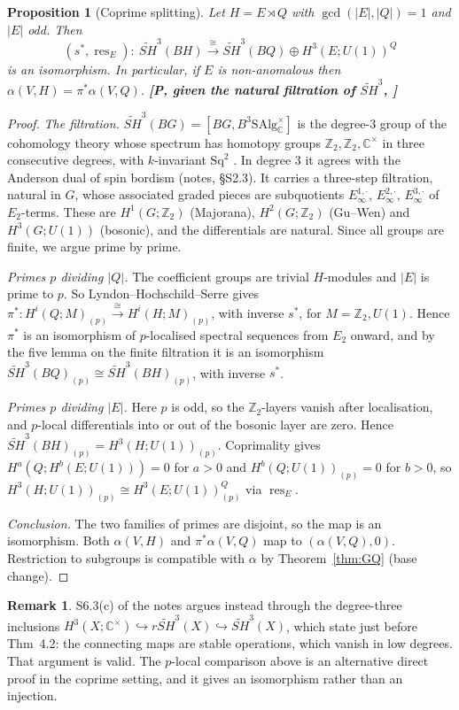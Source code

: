 \documentclass[11pt]{article}
\newtheorem{proposition}[theorem]{Proposition}
\theoremstyle{definition}
\newtheorem{remark}[theorem]{Remark}
\newcommand{\SH}{\widetilde{SH}}
\newcommand{\Z}{\mathbb Z}
\newcommand{\C}{\mathbb C}
\newcommand{\st}[1]{\textbf{[#1]}}
\begin{document}
\begin{proposition}[Coprime splitting]\label{prop:coprime}
Let $H=E\rtimes Q$ with $\gcd(|E|,|Q|)=1$ and $|E|$ odd. Then
\[
(s^*,\operatorname{res}_E):\ \SH^3(BH)\xrightarrow{\ \cong\ }\SH^3(BQ)\oplus H^3(E;U(1))^Q
\]
is an isomorphism. In particular, if $E$ is non-anomalous then $\alpha(V,H)=\pi^*\alpha(V,Q)$. \st{P, given the natural
filtration of $\SH^3$, \cite[Def.~4.1]{GJF}}
\end{proposition}
\begin{proof}
\emph{The filtration.} $\SH^3(BG)=[BG,B^3\mathrm{SAlg}^\times_\C]$ is the degree-3 group of the
cohomology theory whose spectrum has homotopy groups $\Z_2,\Z_2,\C^\times$ in three consecutive
degrees, with $k$-invariant $\mathrm{Sq}^2$ \cite[Def.~4.1]{GJF}. In degree 3 it agrees with the
Anderson dual of spin bordism (notes, \S S2.3). It carries a three-step filtration, natural in $G$, whose
associated graded pieces are subquotients $E_\infty^{1,\cdot}$, $E_\infty^{2,\cdot}$,
$E_\infty^{3,\cdot}$ of $E_2$-terms. These are $H^1(G;\Z_2)$ (Majorana), $H^2(G;\Z_2)$ (Gu--Wen)
and $H^3(G;U(1))$ (bosonic), and the differentials are natural. Since all groups are finite, we
argue prime by prime.

\emph{Primes $p$ dividing $|Q|$.} The coefficient groups are trivial $H$-modules and $|E|$ is
prime to $p$. So Lyndon--Hochschild--Serre gives
$\pi^*:H^i(Q;M)_{(p)}\xrightarrow{\cong}H^i(H;M)_{(p)}$, with inverse $s^*$, for $M=\Z_2,U(1)$.
Hence $\pi^*$ is an isomorphism of $p$-localised spectral sequences from $E_2$ onward, and by
the five lemma on the finite filtration it is an isomorphism
$\SH^3(BQ)_{(p)}\cong\SH^3(BH)_{(p)}$, with inverse $s^*$.

\emph{Primes $p$ dividing $|E|$.} Here $p$ is odd, so the $\Z_2$-layers vanish after
localisation, and $p$-local differentials into or out of the bosonic layer are zero. Hence
$\SH^3(BH)_{(p)}=H^3(H;U(1))_{(p)}$. Coprimality gives $H^a(Q;H^b(E;U(1)))=0$ for $a>0$ and
$H^b(Q;U(1))_{(p)}=0$ for $b>0$, so $H^3(H;U(1))_{(p)}\cong H^3(E;U(1))^Q_{(p)}$ via
$\operatorname{res}_E$.

\emph{Conclusion.} The two families of primes are disjoint, so the map is an isomorphism. Both
$\alpha(V,H)$ and $\pi^*\alpha(V,Q)$ map to $(\alpha(V,Q),0)$. Restriction to subgroups is
compatible with $\alpha$ by Theorem~\ref{thm:GQ} (base change).
\end{proof}

\begin{remark}
S6.3(c) of the notes argues instead through the degree-three inclusions
$H^3(X;\C^\times)\hookrightarrow r\SH^3(X)\hookrightarrow\SH^3(X)$, which \cite{GJF} state just
before Thm~4.2: the connecting maps are stable operations, which vanish in low degrees. That
argument is valid. The $p$-local comparison above is an alternative direct proof in the coprime
setting, and it gives an isomorphism rather than an injection.
\end{remark}
\end{document}
